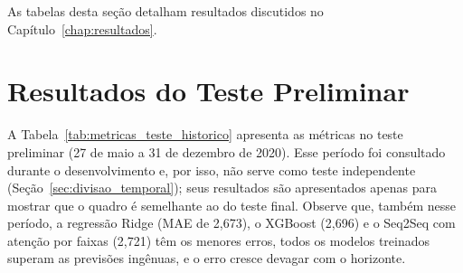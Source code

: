 As tabelas desta seção detalham resultados discutidos no Capítulo~\ref{chap:resultados}.













\section{Resultados do Teste Preliminar}

A Tabela~\ref{tab:metricas_teste_historico} apresenta as métricas no teste preliminar (27 de maio a 31 de dezembro de 2020). Esse período foi consultado durante o desenvolvimento e, por isso, não serve como teste independente (Seção~\ref{sec:divisao_temporal}); seus resultados são apresentados apenas para mostrar que o quadro é semelhante ao do teste final. Observe que, também nesse período, a regressão Ridge (MAE de 2,673), o XGBoost (2,696) e o Seq2Seq com atenção por faixas (2,721) têm os menores erros, todos os modelos treinados superam as previsões ingênuas, e o erro cresce devagar com o horizonte.

